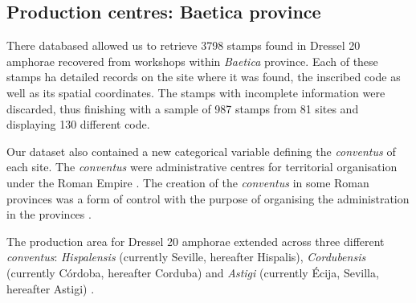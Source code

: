 \documentclass[review]{elsarticle}
\newcommand{\memo}[2]{\textcolor{#1}{#2}}
\newcommand{\xavi}[1]{\memo{magenta}{XRC: #1\\}}
\begin{document}


\subsection{Production centres: Baetica province}


There databased allowed us to retrieve 3798 stamps found in Dressel 20 amphorae recovered from workshops within \textit{Baetica} province. Each of these stamps ha detailed records on the site where it was found, the inscribed code as well as its spatial coordinates. The stamps with incomplete information were discarded, thus finishing with a sample of 987 stamps from 81 sites and displaying 130 different code.


Our dataset also contained a new categorical variable defining the \textit{conventus} of each site. The \textit{conventus} were administrative centres for territorial organisation under the Roman Empire \citep[58]{ozcariz_gil_administracion_2013}.
The creation of the \textit{conventus} in some Roman provinces was a form of control with the purpose of organising the administration in the provinces \citep{albertini_les_1923}.


The production area for Dressel 20 amphorae extended across three different \textit{conventus}: \textit{Hispalensis} (currently Seville, hereafter Hispalis), \textit{Cordubensis} (currently C\'ordoba, hereafter Corduba) and \textit{Astigi} (currently Écija, Sevilla, hereafter Astigi) \citep{rodriguez_economioleicola_1977,chicdatos2001,berni_millet_epigrafianforica_2008} . 
\end{document}
